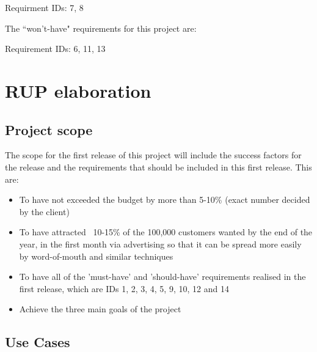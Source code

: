\documentclass{article}
\begin{document}
Requirment IDs: 7, 8

The ``won't-have" requirements for this project are:

Requirement IDs: 6, 11, 13

\section{RUP elaboration}

\subsection{Project scope}

The scope for the first release of this project will include the success factors for the release and the requirements that should be included in this first release. This are:

\begin{itemize}

	\item To have not exceeded the budget by more than 5-10\% (exact number decided by the client)
	\item To have attracted ~10-15\% of the 100,000 customers wanted by the end of the year, in the first month via advertising so that it can be spread more easily by word-of-mouth and similar techniques
	\item To have all of the 'must-have' and 'should-have' requirements realised in the first release, which are IDs 1, 2, 3, 4, 5, 9, 10, 12 and 14
	\item Achieve the three main goals of the project

\end{itemize}

\subsection{Use Cases}
\end{document}
